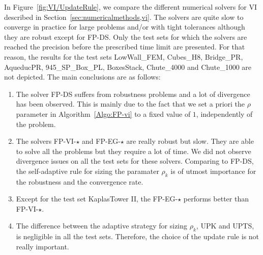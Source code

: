 In Figure~\ref{fig:VI/UpdateRule}, we compare the different numerical solvers for VI described in Section~\ref{sec:numericalmethods,vi}. The solvers are quite slow to converge in practice for large problems and/or with tight tolerances although they are robust except for {\sf FP-DS}. Only the test sets for which the solvers are reached the precision before the prescribed time limit are presented. For that reason, the results for the test sets LowWall\_FEM,  Cubes\_H8, Bridge\_PR, AqueducPR, 945\_SP\_Box\_PL, BoxesStack, Chute\_4000  and Chute\_1000  are not depicted. 
The main conclusions are as follows:
\begin{enumerate}
\item The solver {\sf FP-DS} suffers from robustness problems and a lot of divergence has been observed. This is mainly due to the fact that we set a priori the $\rho$ parameter in Algorithm~\ref{Algo:FP-vi} to a fixed value of $1$, independently of the problem.
\item The solvers {\sf FP-VI-$\star$} and {\sf FP-EG-$\star$} are really robust but slow. They are able to solve all the problems but they require a lot of time. We did not observe divergence issues on all the test sets for these solvers. Comparing to {\sf FP-DS}, the self-adaptive rule for sizing the paramater $\rho_k$ is of utmost importance for the  robustness and the convergence rate.
\item Except for the test set KaplasTower II, the  {\sf FP-EG-$\star$} performs better than  {\sf FP-VI-$\star$}.
\item The difference between the adaptive strategy for sizing $\rho_k$, {\sf UPK} and {\sf UPTS}, is negligible in all the test sets. Therefore, the choice of the update rule is not really important.
\end{enumerate}
